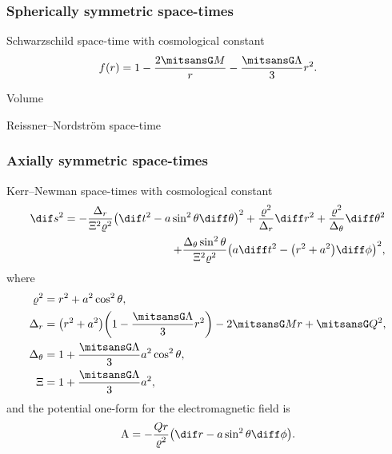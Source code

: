 \subsubsection{Spherically symmetric space-times}


\begin{nameddef}{Schwarzschild space-time with cosmological constant}
\begin{equation}
\rfun{f}{r} = 1-\frac{2\nG M}{r} - \frac{\nG \Lambda}{3}r^2.
\end{equation}
\end{nameddef}

Volume

Reissner--Nordström space-time

\subsubsection{Axially symmetric space-times}

\begin{nameddef}{Kerr--Newman space-times with cosmological constant}
\begin{equation}
\begin{split}
\dif s^2 = -\frac{\Delta_r}{\Xi^2\varrho^2}
\rbr{\dif t^2-a\sin^2\theta \diff\theta}^2
+ \frac{\varrho^2}{\Delta_r}\diff r^2
+ \frac{\varrho^2}{\Delta_\theta}\diff \theta^2 \\
+ \frac{\Delta_\theta \sin^2\theta}{\Xi^2\varrho^2}
\rbr{a\diff t^2 - \rbr{r^2+a^2}\diff\phi}^2,
\end{split}
\end{equation}
where
\begin{align*}
\varrho^2 &= r^2+a^2\cos^2\theta, \\
\Delta_r &= \rbr{r^2+a^2}\rbr{1-\frac{\nG\Lambda}{3}r^2}-2\nG Mr+\nG Q^2, \\
\Delta_\theta &= 1 + \frac{\nG \Lambda}{3}a^2\cos^2\theta, \\
\Xi &= 1 + \frac{\nG \Lambda}{3} a^2,
\end{align*}
and the potential one-form for the electromagnetic field is
\begin{equation}
\mathrm{A} = -\frac{Qr}{\varrho^2}\rbr{\dif r - a \sin^2 \theta \diff\phi}.
\end{equation}
\end{nameddef}